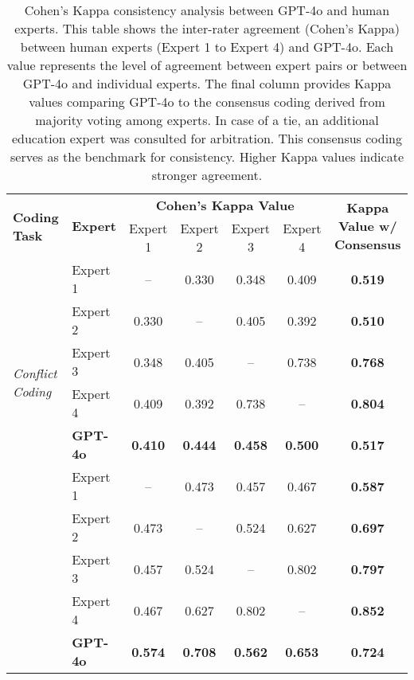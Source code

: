 \begin{table}
    \footnotesize
    \centering
    \caption{Cohen's Kappa consistency analysis between GPT-4o and human experts. This table shows the inter-rater agreement (Cohen’s Kappa) between human experts (Expert 1 to Expert 4) and GPT-4o. Each value represents the level of agreement between expert pairs or between GPT-4o and individual experts. The final column provides Kappa values comparing GPT-4o to the consensus coding derived from majority voting among experts. In case of a tie, an additional education expert was consulted for arbitration. This consensus coding serves as the benchmark for consistency. Higher Kappa values indicate stronger agreement.}
    \label{tab:consistency_analysis} 
    \begin{tabular}{llccccc}
        \toprule
        \multirow{2}{*}{\textbf{Coding Task}} & \multirow{2}{*}{\textbf{Expert}} & \multicolumn{4}{c}{\textbf{Cohen's Kappa Value}} & \multirow{2}{*}{\textbf{Kappa Value w/ Consensus}} \\
        \cmidrule(lr){3-6}
        &  & Expert 1 & Expert 2 & Expert 3 & Expert 4 & \\
        \midrule
        \multirow{6}{*}{\textit{Conflict Coding}} 
        & Expert 1 & -- & 0.330 & 0.348 & 0.409 & \textbf{0.519} \\
        & Expert 2 & 0.330 & -- & 0.405 & 0.392 & \textbf{0.510} \\
        & Expert 3 & 0.348 & 0.405 & -- & 0.738 & \textbf{0.768} \\
        & Expert 4 & 0.409 & 0.392 & 0.738 & -- & \textbf{0.804} \\
        & \textbf{GPT-4o} & \textbf{0.410} & \textbf{0.444} & \textbf{0.458} & \textbf{0.500} & \textbf{0.517} \\
        \midrule
        \multirow{6}{*}{\textit{Behaviour Coding}} 
        & Expert 1 & -- & 0.473 & 0.457 & 0.467 & \textbf{0.587} \\
        & Expert 2 & 0.473 & -- & 0.524 & 0.627 & \textbf{0.697} \\
        & Expert 3 & 0.457 & 0.524 & -- & 0.802 & \textbf{0.797} \\
        & Expert 4 & 0.467 & 0.627 & 0.802 & -- & \textbf{0.852} \\
        & \textbf{GPT-4o} & \textbf{0.574} & \textbf{0.708} & \textbf{0.562} & \textbf{0.653} & \textbf{0.724} \\
        \bottomrule
    \end{tabular}
\end{table}


